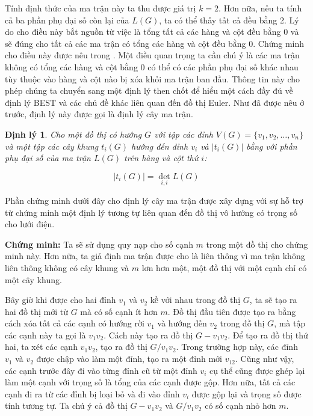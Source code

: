 \documentclass[14pt, a4paper]{article}
\numberwithin{equation}{section}
\numberwithin{figure}{section}
\newtheorem{dl}{Định lý}
\numberwithin{dl}{section}
\numberwithin{md}{section}
\numberwithin{bd}{section}
\numberwithin{dn}{section}
\numberwithin{hq}{section}
\begin{document}
    Tính định thức của ma trận này ta thu được giá trị $k=2$.
    Hơn nữa, nếu ta tính cả ba phần phụ đại số còn lại của $L(G)$, ta có thể thấy tất cả đều bằng 2.
    Lý do cho điều này bắt nguồn từ việc là tổng tất cả các hàng và cột đều bằng 0 và sẽ đúng cho tất cả các ma trận có tổng các hàng và cột đều bằng 0.
    Chứng minh cho điều này được nêu trong \cite{fleischner1990eulerian}.
    Một điều quan trọng ta cần chú ý là các ma trận không có tổng các hàng và cột bằng 0 có thể có các phần phụ đại số khác nhau tùy thuộc vào hàng và cột nào bị xóa khỏi ma trận ban đầu.
    Thông tin này cho phép chúng ta chuyển sang một định lý then chốt để hiểu một cách đầy đủ về định lý BEST và các chủ đề khác liên quan đến đồ thị Euler.
    Như đã được nêu ở trước, định lý này được gọi là định lý cây ma trận.

    \begin{dl}
        Cho một đồ thị có hướng $G$ với tập các đỉnh $V(G)=\lbrace v_1, v_2, \dots, v_n \rbrace$ và một tập các cây khung $t_i (G)$ hướng đến đỉnh $v_i$ và $\lvert t_i(G) \rvert$ bằng với phần phụ đại số của ma trận $L(G)$ trên hàng và cột thứ $i$:

        \begin{equation*}
            \lvert t_i(G) \rvert = \det_{i, i} L(G)
        \end{equation*}
    \end{dl}

    Phần chứng minh dưới đây cho định lý cây ma trận được xây dựng với sự hỗ trợ từ \cite{bollobas1998graduate} chứng minh một định lý tương tự liên quan đến đồ thị vô hướng có trọng số cho lưới điện.

    \textbf{Chứng minh:}
    Ta sẽ sử dụng quy nạp cho số cạnh $m$ trong một đồ thị cho chứng minh này.
    Hơn nữa, ta giả định ma trận được cho là liên thông vì ma trận không liên thông không có cây khung và $m$ lơn hơn một, một đồ thị với một cạnh chỉ có một cây khung.

    Bây giờ khi được cho hai đỉnh $v_1$ và $v_2$ kề với nhau trong đồ thị $G$, ta sẽ tạo ra hai đồ thị mới từ $G$ mà có số cạnh ít hơn $m$.
    Đồ thị đầu tiên được tạo ra bằng cách xóa tất cả các cạnh có hướng rời $v_1$ và hướng đến $v_2$ trong đồ thị $G$, mà tập các cạnh này ta gọi là $v_1 v_2$.
    Cách này tạo ra đồ thị $G - v_1 v_2$.
    Để tạo ra đồ thị thứ hai, ta xét các cạnh $v_1 v_2$, tạo ra đồ thị $G / v_1 v_2$.
    Trong trường hợp này, các đỉnh $v_1$ và $v_2$ được chập vào làm một đỉnh, tạo ra một đỉnh mới $v_{12}$.
    Cũng như vậy, các cạnh trước đây đi vào từng đỉnh cũ từ một đỉnh $v_i$ cụ thể cũng được ghép lại làm một cạnh với trọng số là tổng của các cạnh được gộp.
    Hơn nữa, tất cả các cạnh đi ra từ các đỉnh bị loại bỏ và đi vào đỉnh $v_i$ được gộp lại và trọng số được tính tương tự.
    Ta chú ý cả đồ thị $G - v_1 v_2$ và $G / v_1 v_2$ có số cạnh nhỏ hơn $m$.
\end{document}
